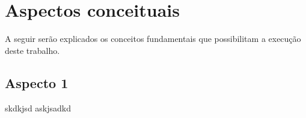 \chapter{Aspectos conceituais}
\label{CAP2}


A seguir serão explicados os conceitos fundamentais que possibilitam a execução deste trabalho. 


\section{Aspecto 1}
skdkjsd \cite{Oetiker:1995} askjsadkd

